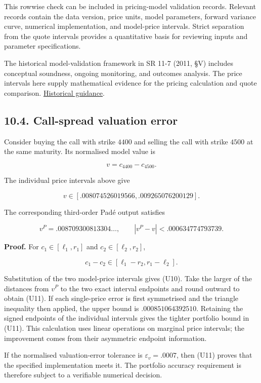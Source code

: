 \documentclass[a4paper,11pt]{article}
\begin{document}
This rowwise check can be included in pricing-model validation records. Relevant records contain the data version, price units, model parameters, forward variance curve, numerical implementation, and model-price intervals. Strict separation from the quote intervals provides a quantitative basis for reviewing inputs and parameter specifications.

The historical model-validation framework in SR 11-7 (2011, §V) includes conceptual soundness, ongoing monitoring, and outcomes analysis. The price intervals here supply mathematical evidence for the pricing calculation and quote comparison. \href{https://www.federalreserve.gov/boarddocs/srletters/2011/sr1107a1.pdf}{Historical guidance}.

\subsection*{10.4. Call-spread valuation error}

Consider buying the call with strike $4400$ and selling the call with strike $4500$ at the same maturity. Its normalised model value is

\[
v=c_{4400}-c_{4500}.
\tag{U9}
\]

The individual price intervals above give

\[
v\in
[.008074526019566,.009265076200129].
\tag{U10}
\]

The corresponding third-order Padé output satisfies

\[
v^P=.008709300813304\ldots,
\qquad
|v^P-v|<.000634774793739.
\tag{U11}
\]

\textbf{Proof.} For $c_1\in[\ell_1,r_1]$ and $c_2\in[\ell_2,r_2]$,

\[
c_1-c_2\in[\ell_1-r_2,r_1-\ell_2].
\]

Substitution of the two model-price intervals gives (U10). Take the larger of the distances from $v^P$ to the two exact interval endpoints and round outward to obtain (U11). If each single-price error is first symmetrised and the triangle inequality then applied, the upper bound is $.000851064392510$. Retaining the signed endpoints of the individual intervals gives the tighter portfolio bound in (U11). This calculation uses linear operations on marginal price intervals; the improvement comes from their asymmetric endpoint information.

If the normalised valuation-error tolerance is $\varepsilon_v=.0007$, then (U11) proves that the specified implementation meets it. The portfolio accuracy requirement is therefore subject to a verifiable numerical decision.
\end{document}
